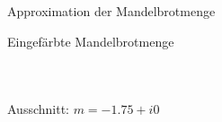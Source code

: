 \begin{frame}{Approximation der Mandelbrotmenge }
\end{frame}

\begin{frame}{Eingefärbte Mandelbrotmenge}
  \begin{columns}
      \begin{figure}[H]
      \end{figure}
  \end{columns}
\end{frame}


\begin{frame}{Ausschnitt: $m =-1.75 + i0$}
  \begin{figure}[H]
      \centering
      \label{fig:colored_region0}
    \end{figure}
\end{frame}



